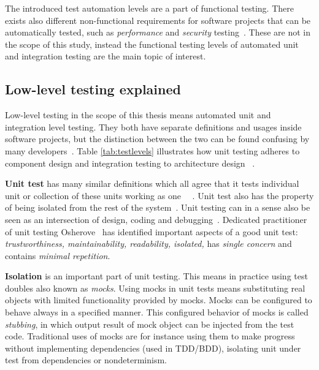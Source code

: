     The introduced test automation levels are a part of functional testing. There exists also different non-functional
    requirements for software projects that can be automatically tested, such as \textit{performance} and \textit{security} testing~\cite{crispin2009agile}.
    These are not in the scope of this study, instead the functional testing levels of automated unit and integration testing are
    the main topic of interest.

    \subsection{Low-level testing explained}
    Low-level testing in the scope of this thesis means automated unit and integration level testing. They both have separate
    definitions and usages inside software projects, but the distinction between the two can be found confusing by many developers~\cite{artofunit2013}.
    Table \ref{tab:testlevels} illustrates how unit testing adheres to component design and integration testing to architecture design ~\cite{itkonen2016}.

    \textbf{Unit test} has many similar definitions which all agree that it tests individual unit or collection of these units working as one
    ~\cite{runeson2006survey}~\cite{whittaker2000software}. Unit test also has the property of being isolated from the rest
    of the system~\cite{whittaker2000software}. Unit testing can in a sense also be seen as an intersection of design,
    coding and debugging~\cite{langr2015pragmatic}.
    Dedicated practitioner of unit testing Osherove~\cite{artofunit2013} has identified important aspects of a good unit test:
    \textit{trustworthiness, maintainability, readability, isolated,} has \textit{single concern} and contains \textit{minimal repetition}.

    \textbf{Isolation} is an important part of unit testing. This means in practice using test doubles also known as \textit{mocks}.
    Using mocks in unit tests means substituting real objects with limited functionality provided by mocks. Mocks can be
    configured to behave always in a specified manner. This configured behavior of mocks is called \textit{stubbing},
    in which output result of mock object can be injected from the test code. Traditional uses of mocks are for instance using
    them to make progress without implementing dependencies (used in TDD/BDD), isolating unit under test from dependencies
    or nondeterminism. ~\cite{chelimsky2010rspec}

